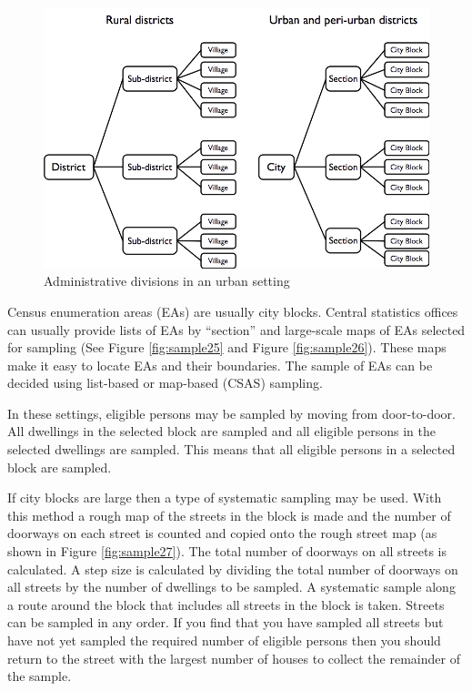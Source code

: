 \documentclass[12pt,a4paper]{book}
\theoremstyle{definition}
\theoremstyle{definition}
\theoremstyle{definition}
\theoremstyle{remark}
\begin{document}
\begin{figure}[H]

{\centering \includegraphics{figures/stage2sample10} 

}

\caption{Administrative divisions in an urban setting}\label{fig:sample24}
\end{figure}

Census enumeration areas (EAs) are usually city blocks. Central
statistics offices can usually provide lists of EAs by ``section'' and
large-scale maps of EAs selected for sampling (See Figure
\ref{fig:sample25} and Figure \ref{fig:sample26}). These maps make it
easy to locate EAs and their boundaries. The sample of EAs can be
decided using list-based or map-based (CSAS) sampling.

In these settings, eligible persons may be sampled by moving from
door-to-door. All dwellings in the selected block are sampled and all
eligible persons in the selected dwellings are sampled. This means that
all eligible persons in a selected block are sampled.

If city blocks are large then a type of systematic sampling may be used.
With this method a rough map of the streets in the block is made and the
number of doorways on each street is counted and copied onto the rough
street map (as shown in Figure \ref{fig:sample27}). The total number of
doorways on all streets is calculated. A step size is calculated by
dividing the total number of doorways on all streets by the number of
dwellings to be sampled. A systematic sample along a route around the
block that includes all streets in the block is taken. Streets can be
sampled in any order. If you find that you have sampled all streets but
have not yet sampled the required number of eligible persons then you
should return to the street with the largest number of houses to collect
the remainder of the sample.
\end{document}
